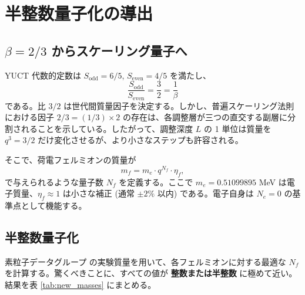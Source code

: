 \documentclass[12pt,a4paper]{article}
\newcommand{\Sodd}{S_{\mathrm{odd}}}
\newcommand{\Seven}{S_{\mathrm{even}}}
\begin{document}
	\section{半整数量子化の導出}
	
	\subsection{\(\beta = 2/3\) からスケーリング量子へ}
	
	YUCT 代数的定数は \(\Sodd = 6/5\), \(\Seven = 4/5\) を満たし、
	\[
	\frac{\Sodd}{\Seven} = \frac{3}{2} = \frac{1}{\beta}
	\]
	である。比 \(3/2\) は世代間質量因子を決定する。しかし、普遍スケーリング法則における因子 \(2/3 = (1/3) \times 2\) の存在は、各調整層が三つの直交する副層に分割されることを示している。したがって、調整深度 \(L\) の 1 単位は質量を \(q^3 = 3/2\) だけ変化させるが、より小さなステップも許容される。
	
	そこで、荷電フェルミオンの質量が
	\begin{equation}
		m_f = m_e \cdot q^{N_f} \cdot \eta_f,
		\label{eq:new}
	\end{equation}
	で与えられるような量子数 \(N_f\) を定義する。ここで \(m_e = 0.51099895\) MeV は電子質量、\(\eta_f \approx 1\) は小さな補正 (通常 \(\pm 2\%\) 以内) である。電子自身は \(N_e = 0\) の基準点として機能する。
	
	\subsection{半整数量子化}
	
	素粒子データグループ \cite{PDG2024} の実験質量を用いて、各フェルミオンに対する最適な \(N_f\) を計算する。驚くべきことに、すべての値が \textbf{整数または半整数} に極めて近い。結果を表 \ref{tab:new_masses} にまとめる。
	
\end{document}
